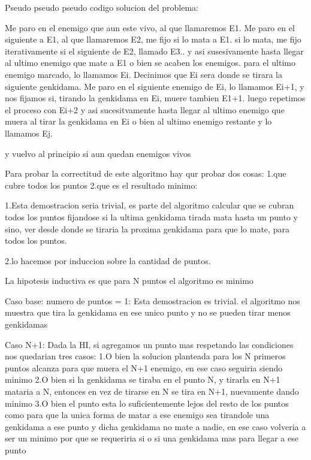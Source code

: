 Pseudo pseudo pseudo codigo solucion del problema:

Me paro en el enemigo que aun este vivo, al que llamaremos E1.
Me paro en el siguiente a E1, al que llamaremos E2, me fijo si lo mata a E1.
si lo mata, me fijo iterativamente si el siguiente de E2, llamado E3.. y asi susesivamente hasta llegar al ultimo enemigo que mate a E1 o bien se acaben los enemigos.
para el ultimo enemigo marcado, lo llamamos Ei.
Decinimos que Ei sera donde se tirara la siguiente genkidama.
Me paro en el siguiente enemigo de Ei, lo llamamos Ei+1, y nos fijamos si, tirando la genkidama en Ei, muere tambien E1+1.
luego repetimos el proceso con Ei+2 y asi sucesitvamente hasta llegar al ultimo enemigo que muera al tirar la genkidama en Ei o bien al ultimo enemigo restante y lo llamamos Ej.

y vuelvo al principio si aun quedan enemigos vivos


Para probar la correctitud de este algoritmo hay qur probar dos cosas:
1.que cubre todos los puntos
2.que es el resultado minimo:


1.Esta demostracion seria trivial, es parte del algoritmo  calcular que se cubran todos los puntos fijandose si la ultima genkidama tirada mata hasta un punto y sino, ver desde donde se tiraria la proxima genkidama para que lo mate, para todos los puntos.

2.lo hacemos por induccion sobre la cantidad de puntos.

La hipotesis inductiva es que para N puntos el algoritmo es minimo

Caso base:
numero de puntos = 1:
Esta demostracion es trivial. el algoritmo nos muestra que tira la genkidama en ese unico punto y no se pueden tirar menos genkidamas

Caso N+1:
Dada  la HI, si agregamos un punto mas respetando las condiciones nos quedarian tres casos:
1.O bien la solucion planteada para los N primeros puntos alcanza para que muera el N+1 enemigo, en ese caso seguiria siendo minimo
2.O bien si la genkidama se tiraba en el punto N, y tirarla en N+1 mataria a N, entonces  en vez de tirarse en N se tira en N+1, nuevamente dando minimo
3.O bien el punto esta lo suficientemente lejos del resto de los puntos como para que la unica forma de matar a ese enemigo sea tirandole una genkidama a ese punto y dicha genkidama no mate a nadie, en ese caso volveria a ser un minimo por que se requeriria si o si una genkidama mas para llegar a ese punto
